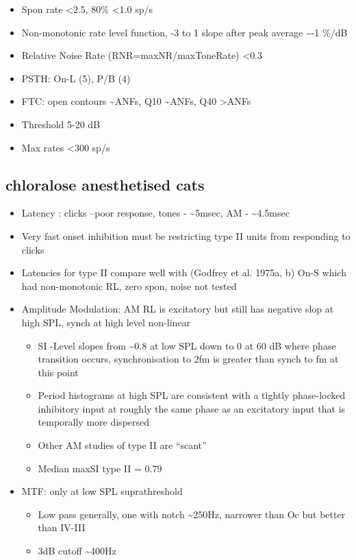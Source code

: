 \documentclass[10pt,a4paper]{article}
\begin{document}
\begin{itemize}
\item Spon rate {\textless}2.5, 80\% {\textless}1.0 sp/s
\item Non-monotonic rate level function, -3 to 1 slope after peak average \~{}-1
  \%/dB
\item Relative Noise Rate (RNR=maxNR/maxToneRate) {\textless}0.3
\item PSTH: On-L (5), P/B (4)
\item FTC: open contours \~{}ANFs, Q10 \~{}ANFs, Q40 {\textgreater}ANFs
\item Threshold 5-20 dB
\item Max rates {\textless}300 sp/s
\end{itemize}
\subsection{\citep{JorisSmith:1998} chloralose anesthetised cats}


\begin{itemize}
\item Latency : clicks --poor response, tones - \~{}5msec, AM - \~{}4.5msec
\item Very fast onset inhibition must be restricting type II units from
  responding to clicks
\item Latencies for type II compare well with (Godfrey et al. 1975a, b) On-S
  which had non-monotonic RL, zero spon, noise not tested
\item Amplitude Modulation: AM RL is excitatory but still has negative slop at
  high SPL, synch at high level non-linear

  \begin{itemize}
  \item SI -Level slopes from \~{}0.8 at low SPL down to 0 at 60 dB where phase
    transition occurs, synchronisation to 2fm is greater than synch to fm at
    this point
  \item Period histograms at high SPL are consistent with a tightly phase-locked
    inhibitory input at roughly the same phase as an excitatory input that is
    temporally more dispersed
  \item Other AM studies of type II are
    {\textquotedblleft}scant{\textquotedblright}
    \citep{KimSirianniEtAl:1990,ZhaoLiang:1995}
  \item Median maxSI type II = 0.79
  \end{itemize}
\item MTF: only at low SPL suprathreshold

  \begin{itemize}
  \item Low pass generally, one with notch \~{}250Hz, narrower than Oc but
    better than IV-III
  \item 3dB cutoff \~{}400Hz
  \end{itemize}
\end{itemize}
\end{document}
